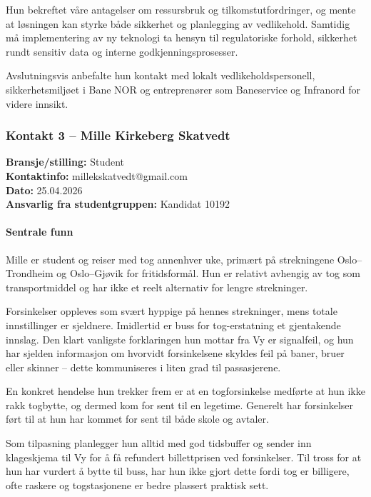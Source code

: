 Hun bekreftet våre antagelser om ressursbruk og tilkomstutfordringer, og mente at løsningen kan styrke både sikkerhet og planlegging av vedlikehold. Samtidig må implementering av ny teknologi ta hensyn til regulatoriske forhold, sikkerhet rundt sensitiv data og interne godkjenningsprosesser.

Avslutningsvis anbefalte hun kontakt med lokalt vedlikeholdspersonell, sikkerhetsmiljøet i Bane NOR og entreprenører som Baneservice og Infranord for videre innsikt.

\subsubsection{Kontakt 3  – Mille Kirkeberg Skatvedt}
\label{kontakt:skatvedt}

\textbf{Bransje/stilling:} Student \\
\textbf{Kontaktinfo:} millekskatvedt@gmail.com \\
\textbf{Dato:} 25.04.2026 \\
\textbf{Ansvarlig fra studentgruppen:} Kandidat 10192

\paragraph{Sentrale funn}

Mille er student og reiser med tog annenhver uke, primært på strekningene Oslo–Trondheim og Oslo–Gjøvik for fritidsformål. Hun er relativt avhengig av tog som transportmiddel og har ikke et reelt alternativ for lengre strekninger.

Forsinkelser oppleves som svært hyppige på hennes strekninger, mens totale innstillinger er sjeldnere. Imidlertid er buss for tog-erstatning et gjentakende innslag. Den klart vanligste forklaringen hun mottar fra Vy er signalfeil, og hun har sjelden informasjon om hvorvidt forsinkelsene skyldes feil på baner, bruer eller skinner – dette kommuniseres i liten grad til passasjerene.

En konkret hendelse hun trekker frem er at en togforsinkelse medførte at hun ikke rakk togbytte, og dermed kom for sent til en legetime. Generelt har forsinkelser ført til at hun har kommet for sent til både skole og avtaler.

Som tilpasning planlegger hun alltid med god tidsbuffer og sender inn klageskjema til Vy for å få refundert billettprisen ved forsinkelser. Til tross for at hun har vurdert å bytte til buss, har hun ikke gjort dette fordi tog er billigere, ofte raskere og togstasjonene er bedre plassert praktisk sett.

